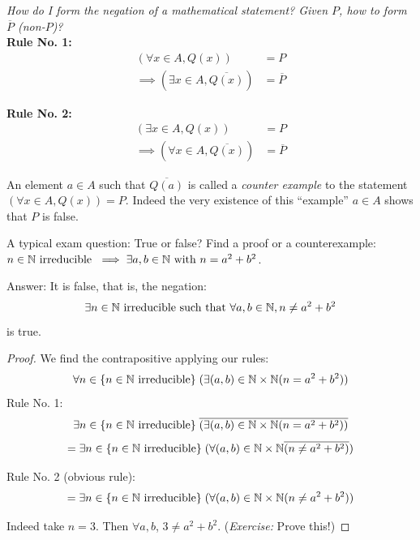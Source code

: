 \documentclass[10pt]{scrartcl}
\begin{document}
\emph{How}
\emph{ do I form the negation of a mathematical statement? Given $P$, how to form $\overline{P}$ (non-$P$)?}\\

\textbf{Rule No. 1:}
\[
\begin{aligned}
  (\forall x \in A, Q(x)) &= P\\
  \implies (\exists x \in A, \overline{Q(x)}) &= \overline{P}
\end{aligned}
\]

\textbf{Rule No. 2: }
\[
\begin{aligned}
  (\exists x \in A, Q(x)) &= P\\
  \implies (\forall x \in A, \overline{Q(x)}) &= \overline{P}
\end{aligned}
\]\vspace*{5pt}

\begin{remark} 
An element $a \in A$ such that $\overline{Q(a)}$ is called a \emph{counter example} to the statement $(\forall x \in A, Q(x)) = P$. Indeed the very existence of this ``example'' $a \in A$ shows that $P$ is false. 	
\end{remark}\vspace*{10pt}

\begin{example}
 A typical exam question: True or false? Find a proof or a counterexample: $n \in \mathbb{N} \text{ irreducible } \implies \exists a,b \in\mathbb{N} \text{ with } n = a^2 + b^2$.

Answer: It is false, that is, the negation: 
\[\exists n\in\mathbb{N} \text{ irreducible  such that } \forall a,b \in\mathbb{N}, n \neq a^2 + b^2\]
is true. 

\begin{proof} 
We find the contrapositive applying our rules: 
\[\forall n \in \{n \in\mathbb{N} \text{ irreducible}\}\; (\exists (a,b) \in \mathbb{N} \times \mathbb{N} (n = a^2 + b^2))\]
  Rule No. 1: 
\[\exists n \in \{n \in\mathbb{N} \text{ irreducible}\}\; \overline{(\exists (a,b) \in \mathbb{N} \times \mathbb{N} (n = a^2 + b^2))}\]
\[=\exists n \in \{n \in\mathbb{N} \text{ irreducible}\}\; (\forall (a,b) \in \mathbb{N} \times \mathbb{N} \overline{(n \neq a^2 + b^2)})\]

  Rule No. 2 (obvious rule): 
\[=\exists n \in \{n \in\mathbb{N} \text{ irreducible}\}\; (\forall (a,b) \in \mathbb{N} \times \mathbb{N} (n \neq a^2 + b^2))\]

Indeed take $n = 3$. Then $\forall a,b$, $3 \neq a^2 + b^2$. (\emph{Exercise:} Prove this!)
\end{proof}
\end{example}
\end{document}
